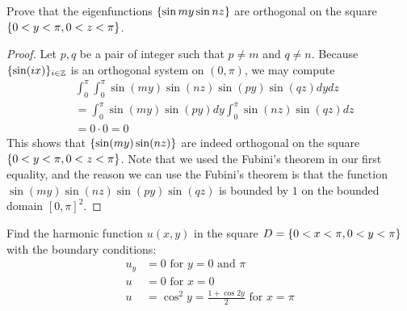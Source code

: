 \documentclass{report}
\begin{document}
\begin{question}{}{}
Prove that the eigenfunctions $\{ \sin my \sin nz \}$ are orthogonal on the square $\{ 0<y<\pi  , 0 <z<\pi  \}$. 
\end{question}
\begin{proof}
Let $p,q$ be a pair of integer such that $p\neq m$ and $q\neq n$. Because $\{ \sin (ix) \}_{i\in\mathbb{Z}}$ is an orthogonal system on $(0,\pi )$, we may compute 
\begin{align*}
&\int_0^{\pi }\int_0^{\pi } \sin (my)\sin (nz) \sin (py)\sin (qz)dydz \\
&= \int_0^{\pi } \sin (my)\sin (py)dy \int_0^{\pi } \sin (nz)\sin (qz)dz \\
&=0 \cdot 0=0 
\end{align*}
This shows that $\{ \sin (my) \sin (nz) \}$ are indeed orthogonal on the square $\{ 0<y<\pi ,0<z<\pi  \}$. Note that we used the Fubini's theorem in our first equality, and the reason we can use the Fubini's theorem is that the function $\sin (my)\sin (nz)\sin (py)\sin (qz)$ is bounded by $1$ on the bounded domain  $[0,\pi ]^2$. 
\end{proof}
\begin{question}{}{}
Find the harmonic function $u(x,y)$ in the square $D= \{ 0<x<\pi  ,0 <y< \pi  \}$ with the boundary conditions: 
\begin{align*}
u_y&=0\text{ for }y=0\text{ and }\pi   \\
u&=0\text{ for }x=0\\
u&=\cos^2 y = \frac{1+ \cos 2y}{2}\text{ for }x=\pi 
\end{align*}
\end{question}
\end{document}
